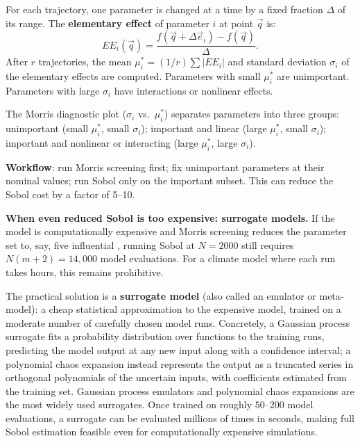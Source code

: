 For each trajectory, one parameter is changed at a time by a fixed
fraction $\Delta$ of its range. The \textbf{elementary effect} of
parameter $i$ at point $\vec{q}$ is:
\begin{equation}
  EE_i(\vec{q}) = \frac{f(\vec{q} + \Delta\vec{e}_i) - f(\vec{q})}{\Delta}.
  \label{eq:EE}
\end{equation}
After $r$ trajectories, the mean $\mu_i^* = (1/r)\sum|EE_i|$
and standard deviation $\sigma_i$ of the elementary effects are computed.
Parameters with small $\mu_i^*$ are unimportant. Parameters with large
$\sigma_i$ have interactions or nonlinear effects.

The Morris diagnostic plot ($\sigma_i$ vs.\ $\mu_i^*$) separates
parameters into three groups: unimportant (small $\mu_i^*$, small $\sigma_i$);
important and linear (large $\mu_i^*$, small $\sigma_i$); important
and nonlinear or interacting (large $\mu_i^*$, large $\sigma_i$).

\textbf{Workflow}: run Morris screening first; fix unimportant parameters
at their nominal values; run Sobol only on the important subset.
This can reduce the Sobol cost by a factor of 5--10.

\medskip

\noindent\textbf{When even reduced Sobol is too expensive: surrogate models.}
If the model is computationally expensive and Morris screening reduces
the parameter set to, say, five influential \POIs, running Sobol at
$N = 2000$ still requires $N(m+2) = 14{,}000$ model evaluations.
For a climate model where each run takes hours, this remains prohibitive.

The practical solution is a \textbf{surrogate model}
(also called an emulator or meta-model): a cheap statistical
approximation to the expensive model, trained on a moderate number of
carefully chosen model runs.
Concretely, a Gaussian process surrogate fits a probability distribution
over functions to the training runs, predicting the model output at any
new input along with a confidence interval; a polynomial chaos expansion
instead represents the output as a truncated series in orthogonal polynomials
of the uncertain inputs, with coefficients estimated from the training set.
Gaussian process emulators and polynomial chaos expansions are the
most widely used surrogates. Once trained on roughly $50$--$200$
model evaluations, a surrogate can be evaluated millions of times
in seconds, making full Sobol estimation feasible even for
computationally expensive simulations.

